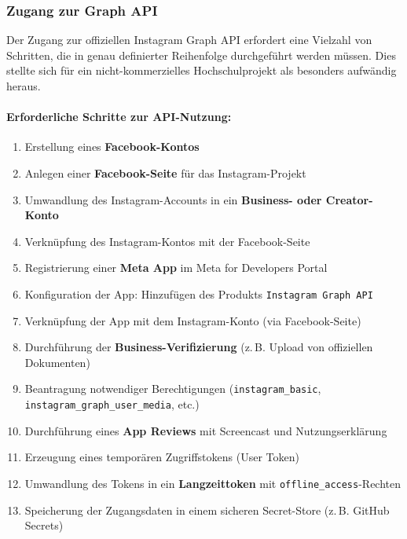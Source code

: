 \documentclass[a4paper,12pt]{article}
\begin{document}
\subsubsection{Zugang zur Graph API}

Der Zugang zur offiziellen Instagram Graph API erfordert eine Vielzahl von Schritten, die in genau definierter Reihenfolge durchgeführt werden müssen. Dies stellte sich für ein nicht-kommerzielles Hochschulprojekt als besonders aufwändig heraus.

\paragraph{Erforderliche Schritte zur API-Nutzung:}
\begin{enumerate}
    \item Erstellung eines \textbf{Facebook-Kontos}
    \item Anlegen einer \textbf{Facebook-Seite} für das Instagram-Projekt
    \item Umwandlung des Instagram-Accounts in ein \textbf{Business- oder Creator-Konto}
    \item Verknüpfung des Instagram-Kontos mit der Facebook-Seite
    \item Registrierung einer \textbf{Meta App} im Meta for Developers Portal
    \item Konfiguration der App: Hinzufügen des Produkts \texttt{Instagram Graph API}
    \item Verknüpfung der App mit dem Instagram-Konto (via Facebook-Seite)
    \item Durchführung der \textbf{Business-Verifizierung} (z.\,B. Upload von offiziellen Dokumenten)
    \item Beantragung notwendiger Berechtigungen (\texttt{instagram\_basic}, \texttt{instagram\_graph\_user\_media}, etc.)
    \item Durchführung eines \textbf{App Reviews} mit Screencast und Nutzungserklärung
    \item Erzeugung eines temporären Zugriffstokens (User Token)
    \item Umwandlung des Tokens in ein \textbf{Langzeittoken} mit \texttt{offline\_access}-Rechten
    \item Speicherung der Zugangsdaten in einem sicheren Secret-Store (z.\,B. GitHub Secrets)
\end{enumerate}
\end{document}
